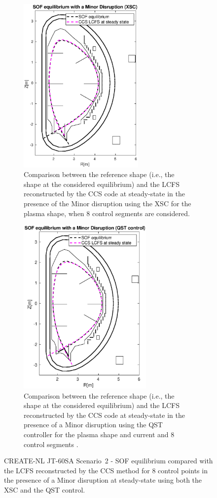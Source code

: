 \begin{figure}[h]
	\centering
		\begin{subfigure}[b]{0.32\textwidth}
		\includegraphics[height=8.75cm] {Chp3/Results_iso/8_gaps_mnr_disrp_equilVsLCFS.eps}  
		\caption{Comparison between the reference shape (i.e., the shape at the considered equilibrium) and the LCFS reconstructed by the  CCS code at steady-state in the presence of the Minor disruption  using the XSC for the plasma shape, when 8 control segments are considered.
		\label{XSC_isoflux_ss} }
			\end{subfigure}
	\hspace{2 cm}
				\begin{subfigure}[b]{0.32\textwidth}
			\includegraphics[height=8.75cm] {Chp3/Results_iso/8_gaps_mnr_disrp_equilVsLCFS_FBC.eps}  
			\caption{Comparison between the reference shape (i.e., the shape at the considered equilibrium) and the LCFS reconstructed by the CCS code at steady-state in the presence of a Minor disruption using the QST controller for the plasma shape and current and 8 control segments . 
				\label{FBS_isoflux_ss} }
		\end{subfigure}
		

\caption{ CREATE-NL JT-60SA Scenario~2 - SOF equilibrium compared with the LCFS reconstructed by the CCS method for 8 control points in the presence of a Minor disruption at steady-state using both the XSC and the QST control.  \label{compFBC_XSC_ss}}
\end{figure}




